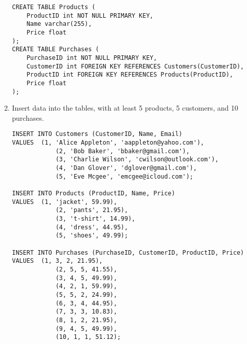 \documentclass[notitlepage, 11pt]{report}
\begin{document}
\begin{enumerate}[itemindent=-1.5em]
\begin{lstlisting}
CREATE TABLE Products (
	ProductID int NOT NULL PRIMARY KEY,
	Name varchar(255),
	Price float
);
CREATE TABLE Purchases (
	PurchaseID int NOT NULL PRIMARY KEY,
	CustomerID int FOREIGN KEY REFERENCES Customers(CustomerID),
	ProductID int FOREIGN KEY REFERENCES Products(ProductID),
	Price float
);
\end{lstlisting}
	\item Insert data into the tables, with at least 5 products, 5 customers, and 10 purchases.
\begin{lstlisting}
INSERT INTO Customers (CustomerID, Name, Email)
VALUES	(1, 'Alice Appleton', 'aappleton@yahoo.com'),
			(2, 'Bob Baker', 'bbaker@gmail.com'),
			(3, 'Charlie Wilson', 'cwilson@outlook.com'),
			(4, 'Dan Glover', 'dglover@gmail.com'),
			(5, 'Eve Mcgee', 'emcgee@icloud.com');

INSERT INTO Products (ProductID, Name, Price)
VALUES	(1, 'jacket', 59.99),
			(2, 'pants', 21.95),
			(3, 't-shirt', 14.99),
			(4, 'dress', 44.95),
			(5, 'shoes', 49.99);

INSERT INTO Purchases (PurchaseID, CustomerID, ProductID, Price)
VALUES	(1, 3, 2, 21.95),
			(2, 5, 5, 41.55),
			(3, 4, 5, 49.99),
			(4, 2, 1, 59.99),
			(5, 5, 2, 24.99),
			(6, 3, 4, 44.95),
			(7, 3, 3, 10.83),
			(8, 1, 2, 21.95),
			(9, 4, 5, 49.99),
			(10, 1, 1, 51.12);
\end{lstlisting}
\end{enumerate}
\end{document}
